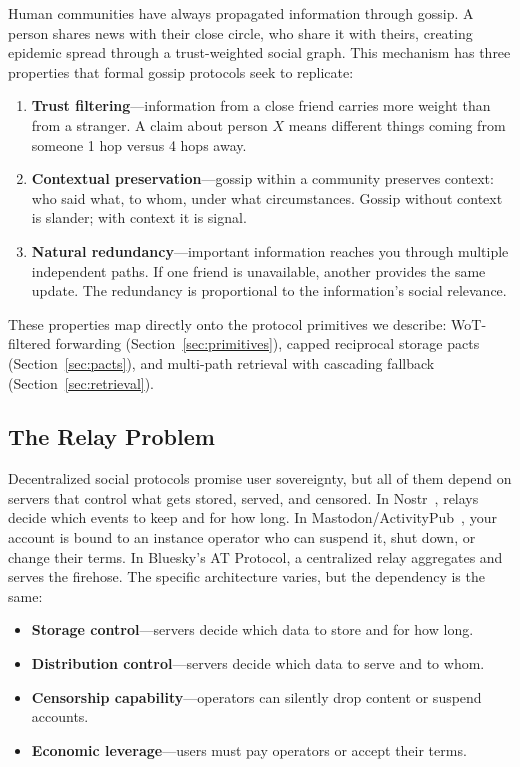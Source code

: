 \documentclass[11pt,a4paper]{article}
\begin{document}
Human communities have always propagated information through gossip. A person shares news with their close circle, who share it with theirs, creating epidemic spread through a trust-weighted social graph. This mechanism has three properties that formal gossip protocols seek to replicate:

\begin{enumerate}
  \item \textbf{Trust filtering}---information from a close friend carries more weight than from a stranger. A claim about person $X$ means different things coming from someone 1 hop versus 4 hops away.
  \item \textbf{Contextual preservation}---gossip within a community preserves context: who said what, to whom, under what circumstances. Gossip without context is slander; with context it is signal.
  \item \textbf{Natural redundancy}---important information reaches you through multiple independent paths. If one friend is unavailable, another provides the same update. The redundancy is proportional to the information's social relevance.
\end{enumerate}

These properties map directly onto the protocol primitives we describe: WoT-filtered forwarding (Section~\ref{sec:primitives}), capped reciprocal storage pacts (Section~\ref{sec:pacts}), and multi-path retrieval with cascading fallback (Section~\ref{sec:retrieval}).

\subsection{The Relay Problem}

Decentralized social protocols promise user sovereignty, but all of them depend on servers that control what gets stored, served, and censored. In Nostr~\cite{nostr}, relays decide which events to keep and for how long. In Mastodon/ActivityPub~\cite{activitypub}, your account is bound to an instance operator who can suspend it, shut down, or change their terms. In Bluesky's AT Protocol, a centralized relay aggregates and serves the firehose. The specific architecture varies, but the dependency is the same:

\begin{itemize}
  \item \textbf{Storage control}---servers decide which data to store and for how long.
  \item \textbf{Distribution control}---servers decide which data to serve and to whom.
  \item \textbf{Censorship capability}---operators can silently drop content or suspend accounts.
  \item \textbf{Economic leverage}---users must pay operators or accept their terms.
\end{itemize}
\end{document}
